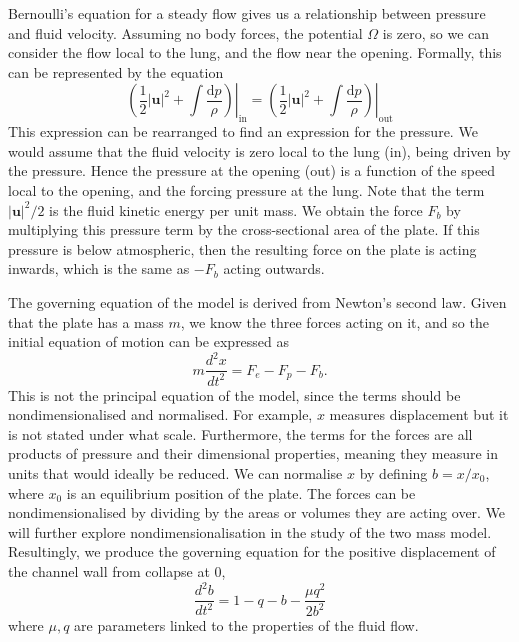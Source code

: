 Bernoulli's equation for a steady flow gives us a relationship between pressure and fluid velocity.
Assuming no body forces, the potential $\Omega$ is zero,
so we can consider the flow local to the lung, and the flow near the opening.
Formally, this can be represented by the equation
\begin{equation}
    \left.\left(\frac{1}{2}|\mathbf{u}|^2 + \int \frac{\mathrm{d}p}{\rho}\right)\right|_\mathrm{in} = \left.\left(\frac{1}{2}|\mathbf{u}|^2 + \int \frac{\mathrm{d}p}{\rho}\right)\right|_\mathrm{out}
\end{equation}
This expression can be rearranged to find an expression for the pressure.
We would assume that the fluid velocity is zero local to the lung (in),
being driven by the pressure.
Hence the pressure at the opening (out) is a function of the speed local to the opening,
and the forcing pressure at the lung.
Note that the term $|\mathbf{u}|^2/2$ is the fluid kinetic energy per unit mass.
We obtain the force $F_b$ by multiplying this pressure term by the cross-sectional area of the plate.
If this pressure is below atmospheric,
then the resulting force on the plate is acting inwards,
which is the same as $-F_b$ acting outwards.

The governing equation of the model is derived from Newton's second law.
Given that the plate has a mass $m$, we know the three forces acting on it,
and so the initial equation of motion can be expressed as
\begin{equation}
    m\frac{d^2 x}{dt^2} = F_e - F_p - F_b.
    \label{eqn:model_init}
\end{equation}
This is not the principal equation of the model,
since the terms should be nondimensionalised and normalised.
For example, $x$ measures displacement but it is not stated under what scale.
Furthermore, the terms for the forces are all products of pressure and their dimensional properties,
meaning they measure in units that would ideally be reduced.
We can normalise $x$ by defining $b = x/x_0$, where $x_0$ is an equilibrium position of the plate.
The forces can be nondimensionalised by dividing by the areas or volumes they are acting over.
We will further explore nondimensionalisation in the study of the two mass model.
Resultingly, we produce the governing equation for the positive displacement of the channel wall from collapse at $0$,
\begin{equation}
    \frac{d^2b}{dt^2} = 1 - q - b - \frac{\mu q^2}{2b^2}
    \label{eqn:master}
\end{equation}
where $\mu, q$ are parameters linked to the properties of the fluid flow.


